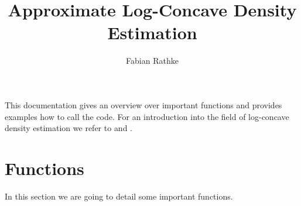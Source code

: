 \documentclass[a4paper,11pt]{article}
\title{Approximate Log-Concave Density Estimation}
\author{Fabian Rathke}
\begin{document}
\maketitle
This documentation gives an overview over important functions and provides examples how to call the code. For an introduction into the field of log-concave density estimation we refer to \cite{cule2010} and \cite{rathke2015b}.

\section{Functions}
In this section we are going to detail some important functions.



\end{document}
